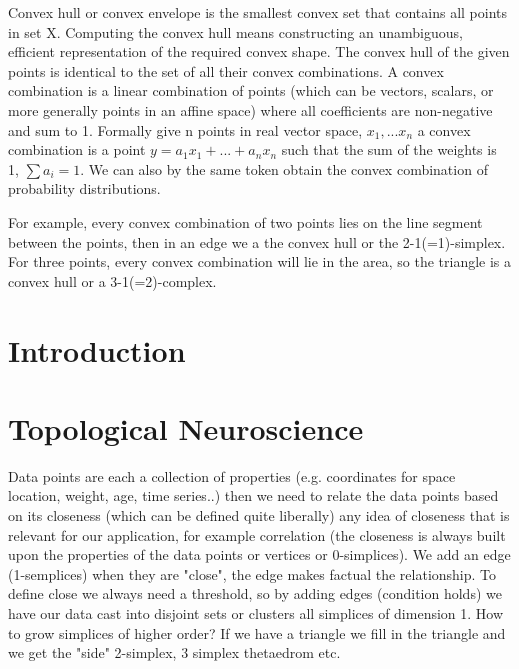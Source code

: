 \documentclass[onecollarge,runningheads]{svjour2}
\begin{document}
Convex hull or convex envelope is the smallest convex set that contains all points in set X. Computing the convex hull means constructing an unambiguous, efficient representation of the required convex shape. The convex hull of the given points is identical to the set of all their convex combinations.
A convex combination is a linear combination of points (which can be vectors, scalars, or more generally points in an affine space) where all coefficients are non-negative and sum to 1. Formally give n points in real vector space, $x_1, ... x_n$ a convex combination is a point $y=a_{1}x_1 + ... + a_{n}x_n$ such that the sum of the weights is 1, $\sum a_i = 1$. We can also by the same token obtain the convex combination of probability distributions. 

For example, every convex combination of two points lies on the line segment between the points, then in an edge we a the convex hull or the 2-1(=1)-simplex. For three points, every convex combination will lie in the area, so the triangle is a convex hull or a 3-1(=2)-complex. %

\section{Introduction}
\label{intro}

\section{Topological Neuroscience}
Data points are each a collection of properties (e.g. coordinates for space location, weight, age, time series..) then we need to relate the data points based on its closeness (which can be defined quite liberally) any idea of closeness that is relevant for our application, for example correlation (the closeness is always built upon the properties of the data points or vertices or 0-simplices). We add an edge (1-semplices) when they are "close", the edge makes factual the relationship. To define close we always need a threshold, so by adding edges (condition holds) we have our data cast into disjoint sets or clusters all simplices of dimension 1.
How to grow simplices of higher order? If we have a triangle we fill in the triangle and we get the "side" 2-simplex, 3 simplex thetaedrom etc.
\end{document}
